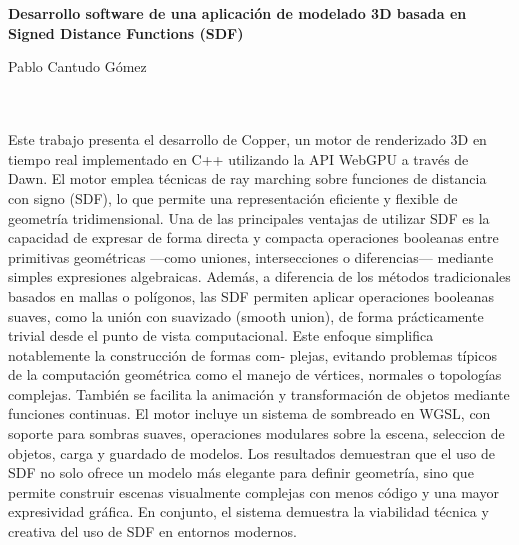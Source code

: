 \chapter*{}


\cleardoublepage
\thispagestyle{empty}

\begin{center}
{\large\bfseries Desarrollo software de una aplicación de modelado 3D
basada en Signed Distance Functions (SDF)}\\
\end{center}
\begin{center}
Pablo Cantudo Gómez\\
\end{center}

\\

\vspace{0.7cm}
\\

Este trabajo presenta el desarrollo de Copper, un motor de renderizado 3D en
tiempo real implementado en C++ utilizando la API WebGPU a través de
Dawn. El motor emplea técnicas de ray marching sobre funciones de distancia
con signo (SDF), lo que permite una representación eficiente y flexible de
geometría tridimensional. Una de las principales ventajas de utilizar SDF es
la capacidad de expresar de forma directa y compacta operaciones booleanas
entre primitivas geométricas —como uniones, intersecciones o diferencias—
mediante simples expresiones algebraicas. Además, a diferencia de los métodos
tradicionales basados en mallas o polígonos, las SDF permiten aplicar
operaciones booleanas suaves, como la unión con suavizado (smooth union),
de forma prácticamente trivial desde el punto de vista computacional.
\bigbreak
Este enfoque simplifica notablemente la construcción de formas com-
plejas, evitando problemas típicos de la computación geométrica como el
manejo de vértices, normales o topologías complejas. También se facilita
la animación y transformación de objetos mediante funciones continuas. El
motor incluye un sistema de sombreado en WGSL, con soporte para sombras
suaves, operaciones modulares sobre la escena, seleccion de objetos, carga
y guardado de modelos. Los resultados demuestran que el uso de SDF no
solo ofrece un modelo más elegante para definir geometría, sino que permite
construir escenas visualmente complejas con menos código y una mayor expresividad gráfica.
En conjunto, el sistema demuestra la viabilidad técnica
y creativa del uso de SDF en entornos modernos.
\cleardoublepage


